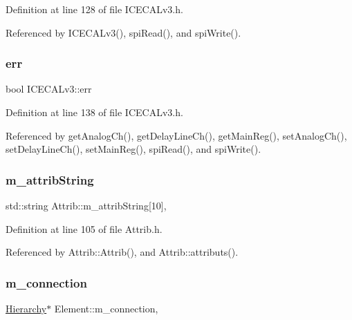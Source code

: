 Definition at line 128 of file I\+C\+E\+C\+A\+Lv3.\+h.



Referenced by I\+C\+E\+C\+A\+Lv3(), spi\+Read(), and spi\+Write().

\mbox{\label{classICECALv3_ad8989925ee5b3ff322d863ce6aaff0bd}} 
\subsubsection{\texorpdfstring{err}{err}}
{\footnotesize\ttfamily bool I\+C\+E\+C\+A\+Lv3\+::err\hspace{0.3cm}{\ttfamily [private]}}



Definition at line 138 of file I\+C\+E\+C\+A\+Lv3.\+h.



Referenced by get\+Analog\+Ch(), get\+Delay\+Line\+Ch(), get\+Main\+Reg(), set\+Analog\+Ch(), set\+Delay\+Line\+Ch(), set\+Main\+Reg(), spi\+Read(), and spi\+Write().

\mbox{\label{classAttrib_a3414521d7a82476e874b25a5407b5e63}} 
\subsubsection{\texorpdfstring{m\+\_\+attrib\+String}{m\_attribString}}
{\footnotesize\ttfamily std\+::string Attrib\+::m\+\_\+attrib\+String\mbox{[}10\mbox{]}\hspace{0.3cm}{\ttfamily [protected]}, {\ttfamily [inherited]}}



Definition at line 105 of file Attrib.\+h.



Referenced by Attrib\+::\+Attrib(), and Attrib\+::attributs().

\mbox{\label{classElement_abe3de7a5dbbc9a6dd2d7e012e5fdb266}} 
\subsubsection{\texorpdfstring{m\+\_\+connection}{m\_connection}}
{\footnotesize\ttfamily \hyperlink{classHierarchy}{Hierarchy}$\ast$ Element\+::m\+\_\+connection\hspace{0.3cm}{\ttfamily [protected]}, {\ttfamily [inherited]}}



